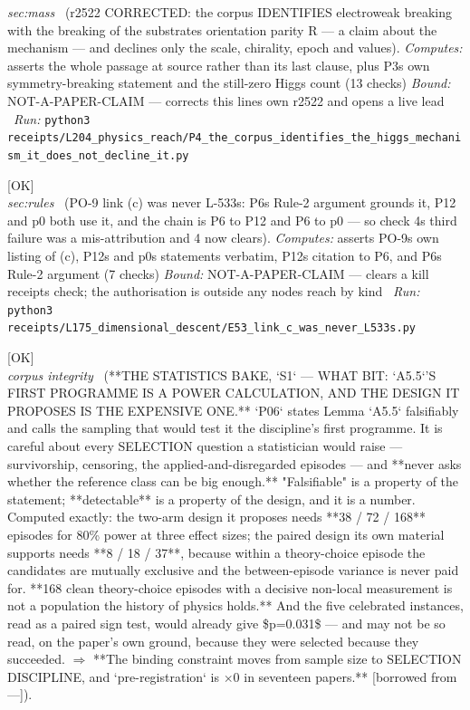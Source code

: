 \begin{description}
\textit{sec:mass} \ (r2522 CORRECTED: the corpus IDENTIFIES electroweak breaking with the breaking of the substrates orientation parity R --- a claim about the mechanism --- and declines only the scale, chirality, epoch and values). 
\emph{Computes:} asserts the whole passage at source rather than its last clause, plus P3s own symmetry-breaking statement and the still-zero Higgs count (13 checks)
 \emph{Bound:} NOT-A-PAPER-CLAIM --- corrects this lines own r2522 and opens a live lead
\ \emph{Run:} \texttt{python3 receipts/L204\_physics\_reach/P4\_the\_corpus\_identifies\_the\_higgs\_mechanism\_it\_does\_not\_decline\_it.py}
\item[\label{rcpt:E53_link_c_was_never_L533s}\textbf{}\quad\texttt{E53\_link\_c\_was\_never\_L533s}]\hfill\textsf{[OK]}\\
\textit{sec:rules} \ (PO-9 link (c) was never L-533s: P6s Rule-2 argument grounds it, P12 and p0 both use it, and the chain is P6 to P12 and P6 to p0 --- so check 4s third failure was a mis-attribution and 4 now clears). 
\emph{Computes:} asserts PO-9s own listing of (c), P12s and p0s statements verbatim, P12s citation to P6, and P6s Rule-2 argument (7 checks)
 \emph{Bound:} NOT-A-PAPER-CLAIM --- clears a kill receipts check; the authorisation is outside any nodes reach by kind
\ \emph{Run:} \texttt{python3 receipts/L175\_dimensional\_descent/E53\_link\_c\_was\_never\_L533s.py}
\item[\label{rcpt:S1_the_first_programme_is_a_power_calculation_and_the_design_it_proposes_is_the_expensive_one}\textbf{}\quad\texttt{S1\_the\_first\_programme\_is\_a\_power\_calculation\_and\_the\_design\_it\_proposes\_is\_the\_expensive\_one}]\hfill\textsf{[OK]}\\
\textit{corpus integrity} \ (**THE STATISTICS BAKE, `S1` --- WHAT BIT: `A5.5`'S FIRST PROGRAMME IS A POWER CALCULATION, AND THE DESIGN IT PROPOSES IS THE EXPENSIVE ONE.** `P06` states Lemma `A5.5` falsifiably and calls the sampling that would test it the discipline's first programme. It is careful about every SELECTION question a statistician would raise --- survivorship, censoring, the applied-and-disregarded episodes --- and **never asks whether the reference class can be big enough.** "Falsifiable" is a property of the statement; **detectable** is a property of the design, and it is a number. Computed exactly: the two-arm design it proposes needs **38 / 72 / 168** episodes for 80\% power at three effect sizes; the paired design its own material supports needs **8 / 18 / 37**, because within a theory-choice episode the candidates are mutually exclusive and the between-episode variance is never paid for. **168 clean theory-choice episodes with a decisive non-local measurement is not a population the history of physics holds.** And the five celebrated instances, read as a paired sign test, would already give \$p=0.031\$ --- and may not be so read, on the paper's own ground, because they were selected because they succeeded. \ensuremath{\Rightarrow} **The binding constraint moves from sample size to SELECTION DISCIPLINE, and `pre-registration` is \ensuremath{\times}0 in seventeen papers.** [borrowed from ---]). 

\end{description}
